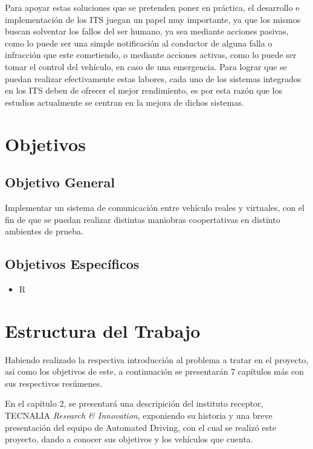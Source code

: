 \par Para apoyar estas soluciones que se pretenden poner en práctica, el
 desarrollo e implementación de los ITS juegan un papel muy importante,
 ya que los mismos buscan solventar los fallos del ser humano, ya sea mediante
  acciones pasivas, como lo puede ser una simple notificación al conductor de
  alguna falla o infracción que este cometiendo, o mediante acciones activas,
  como lo puede ser tomar el control del vehículo, en caso de una emergencia.
  Para lograr que se puedan realizar efectivamente estas labores, cada uno de
  los sistemas integrados en los ITS deben de ofrecer el mejor rendimiento, es
   por esta razón que los estudios actualmente se centran en la mejora de dichos
    sistemas.\\

\section{Objetivos}

\subsection{Objetivo General}

Implementar un sistema de comunicación entre vehículo reales y virtuales, con
el fin de que se puedan realizar distintas maniobras coopertativas en distinto
 ambientes de prueba.

\subsection{Objetivos Específicos}
\begin{itemize}
	\item R
\end{itemize}

\section{Estructura del Trabajo}

Habiendo realizado la respectiva introducción al problema a tratar en el
proyecto, así como los objetivos de este, a continuación se presentarán 7
capítulos más con sus respectivos resúmenes.\\

\par En el capítulo 2, se presentará una descripición del instituto receptor,
TECNALIA \textit{Research \& Innovation}, exponiendo su historia y una breve
 presentación del equipo de Automated Driving, con el cual se realizó este
  proyecto, dando a conocer sus objetivos y los vehículos que cuenta.\\
